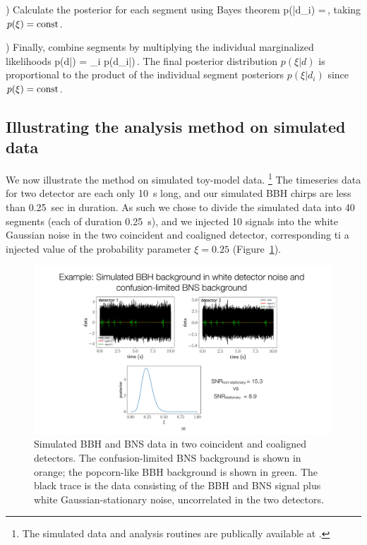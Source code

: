 \smallskip
{}) Calculate the posterior for each segment
using Bayes theorem
%
\be
p(\xi|d_i)
=\,,
\ee
%
taking $p(\xi)={\rm const}$.

\smallskip
{}) Finally, combine segments
by multiplying the individual marginalized likelihoods
%
\be
p(d|\xi) = \prod_{i} p(d_i|\xi)\,.
\ee
%
The final posterior distribution $p(\xi|d)$ is
proportional to the product of the individual segment 
posteriors $p(\xi|d_i)$ since $p(\xi)={\rm const}$.

\subsection{Illustrating the analysis method on simulated data}

We now illustrate the method on simulated toy-model
data.%
\footnote{The simulated data and analysis routines are
publically available at \cite{github}.}
The timeseries data for two detector are each only 
10~s long, and our simulated BBH chirps are less than 
0.25~sec in duration.
As such we chose to divide the simulated data into 40
segments (each of duration 0.25~s), and we injected 10
signals into the white Gaussian noise in the two coincident
and coaligned detector, corresponding ti a injected value 
of the probability parameter $\xi = 0.25$ 
(Figure~\ref{f:BBH-BNS-simulated-data}).
%
\begin{figure}[htbp!]
\begin{center}
\includegraphics[width=\textwidth]{Figures/BBH-BNS-simulated-data}
\caption{Simulated BBH and BNS data in two coincident and coaligned
detectors.
The confusion-limited BNS background is shown in orange;
the popcorn-like BBH background is shown in green.
The black trace is the data consisting of the BBH and BNS signal
plus white Gaussian-stationary noise, uncorrelated in the two
detectors.}
\label{f:BBH-BNS-simulated-data}
\end{center}
\end{figure}

